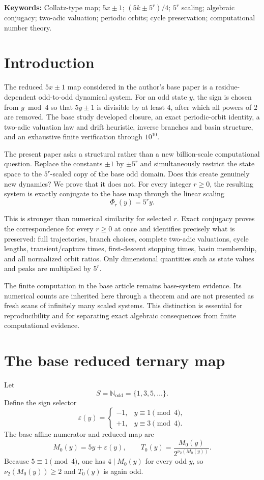 \documentclass[11pt]{article}
\theoremstyle{remark}
\newcommand{\vTwo}{\nu_2}
\newcommand{\Nodd}{\mathbb N_{\mathrm{odd}}}
\newcommand{\eps}{\varepsilon}
\begin{document}
\noindent\textbf{Keywords:} Collatz-type map; $5x\pm1$; $(5k\pm5^r)/4$; $5^r$ scaling; algebraic conjugacy; two-adic valuation; periodic orbits; cycle preservation; computational number theory.

\section{Introduction}

The reduced $5x\pm1$ map considered in the author's base paper is a residue-dependent odd-to-odd dynamical system.  For an odd state $y$, the sign is chosen from $y\bmod4$ so that $5y\pm1$ is divisible by at least $4$, after which all powers of $2$ are removed.  The base study developed closure, an exact periodic-orbit identity, a two-adic valuation law and drift heuristic, inverse branches and basin structure, and an exhaustive finite verification through $10^{10}$.

The present paper asks a structural rather than a new billion-scale computational question.  Replace the constants $\pm1$ by $\pm5^r$ and simultaneously restrict the state space to the $5^r$-scaled copy of the base odd domain.  Does this create genuinely new dynamics?  We prove that it does not.  For every integer $r\ge0$, the resulting system is exactly conjugate to the base map through the linear scaling
\[
\Phi_r(y)=5^r y.
\]

This is stronger than numerical similarity for selected $r$.  Exact conjugacy proves the correspondence for every $r\ge0$ at once and identifies precisely what is preserved: full trajectories, branch choices, complete two-adic valuations, cycle lengths, transient/capture times, first-descent stopping times, basin membership, and all normalized orbit ratios.  Only dimensional quantities such as state values and peaks are multiplied by $5^r$.

The finite computation in the base article remains base-system evidence.  Its numerical counts are inherited here through a theorem and are not presented as fresh scans of infinitely many scaled systems.  This distinction is essential for reproducibility and for separating exact algebraic consequences from finite computational evidence.

\section{The base reduced ternary map}

Let
\[
S=\Nodd=\{1,3,5,\ldots\}.
\]
Define the sign selector
\[
\eps(y)=
\begin{cases}
-1,&y\equiv1\pmod4,\\
+1,&y\equiv3\pmod4.
\end{cases}
\]
The base affine numerator and reduced map are
\begin{equation}
M_0(y)=5y+\eps(y),
\qquad
T_0(y)=\frac{M_0(y)}{2^{\vTwo(M_0(y))}}.
\label{eq:base}
\end{equation}
Because $5\equiv1\pmod4$, one has $4\mid M_0(y)$ for every odd $y$, so $\vTwo(M_0(y))\ge2$ and $T_0(y)$ is again odd.
\end{document}
